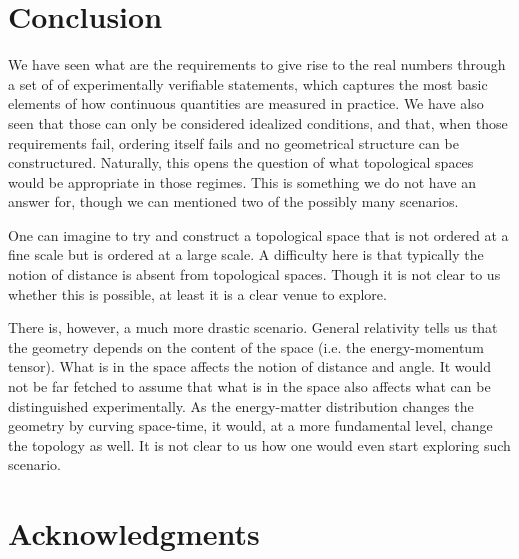 \documentclass[12pt]{iopart}
\begin{document}
\section{Conclusion}

We have seen what are the requirements to give rise to the real numbers through a set of of experimentally verifiable statements, which captures the most basic elements of how continuous quantities are measured in practice. We have also seen that those can only be considered idealized conditions, and that, when those requirements fail, ordering itself fails and no geometrical structure can be constructured. Naturally, this opens the question of what topological spaces would be appropriate in those regimes. This is something we do not have an answer for, though we can mentioned two of the possibly many scenarios.

One can imagine to try and construct a topological space that is not ordered at a fine scale but is ordered at a large scale. A difficulty here is that typically the notion of distance is absent from topological spaces. Though it is not clear to us whether this is possible, at least it is a clear venue to explore.

There is, however, a much more drastic scenario. General relativity tells us that the geometry depends on the content of the space (i.e. the energy-momentum tensor). What is in the space affects the notion of distance and angle. It would not be far fetched to assume that what is in the space also affects what can be distinguished experimentally. As the energy-matter distribution changes the geometry by curving space-time, it would, at a more fundamental level, change the topology as well. It is not clear to us how one would even start exploring such scenario.


\section*{Acknowledgments}
\end{document}
